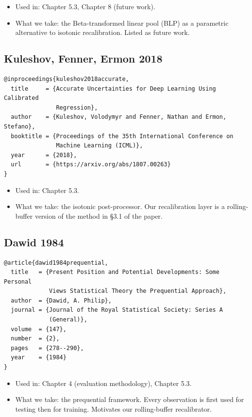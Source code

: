 \documentclass[11pt,a4paper,openany]{report}
\begin{document}
\begin{itemize}
  \item Used in: Chapter 5.3, Chapter 8 (future work).
  \item What we take: the Beta-transformed linear pool (BLP) as a parametric
    alternative to isotonic recalibration. Listed as future work.
\end{itemize}

\subsection{Kuleshov, Fenner, Ermon 2018}

\begin{verbatim}
@inproceedings{kuleshov2018accurate,
  title     = {Accurate Uncertainties for Deep Learning Using Calibrated
               Regression},
  author    = {Kuleshov, Volodymyr and Fenner, Nathan and Ermon, Stefano},
  booktitle = {Proceedings of the 35th International Conference on
               Machine Learning (ICML)},
  year      = {2018},
  url       = {https://arxiv.org/abs/1807.00263}
}
\end{verbatim}

\begin{itemize}
  \item Used in: Chapter 5.3.
  \item What we take: the isotonic post-processor. Our recalibration layer is
    a rolling-buffer version of the method in §3.1 of the paper.
\end{itemize}

\subsection{Dawid 1984}

\begin{verbatim}
@article{dawid1984prequential,
  title   = {Present Position and Potential Developments: Some Personal
             Views Statistical Theory the Prequential Approach},
  author  = {Dawid, A. Philip},
  journal = {Journal of the Royal Statistical Society: Series A
             (General)},
  volume  = {147},
  number  = {2},
  pages   = {278--290},
  year    = {1984}
}
\end{verbatim}

\begin{itemize}
  \item Used in: Chapter 4 (evaluation methodology), Chapter 5.3.
  \item What we take: the prequential framework. Every observation is first
    used for testing then for training. Motivates our rolling-buffer
    recalibrator.
\end{itemize}
\end{document}
